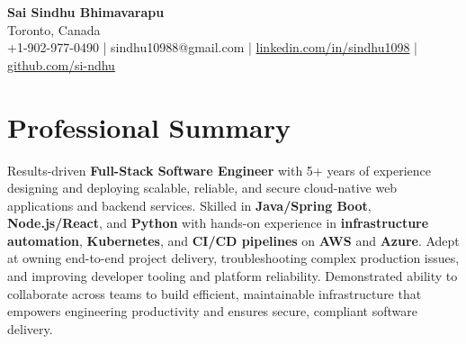 \documentclass[letterpaper,11pt]{article}
\begin{document}
\begin{center}
  {\Large \textbf{Sai Sindhu Bhimavarapu}} \\
  Toronto, Canada \\
  +1-902-977-0490 \enspace | \enspace sindhu10988@gmail.com \enspace | \enspace \href{https://www.linkedin.com/in/sindhu1098/}{linkedin.com/in/sindhu1098} \enspace | \enspace \href{https://github.com/si-ndhu}{github.com/si-ndhu}
\end{center}

\section{Professional Summary}
  \begin{itemize}[leftmargin=0.15in, label={}]
    \small{\item{
     Results-driven \textbf{Full-Stack Software Engineer} with 5+ years of experience designing and deploying scalable, reliable, and secure cloud-native web applications and backend services. Skilled in \textbf{Java/Spring Boot}, \textbf{Node.js/React}, and \textbf{Python} with hands-on experience in \textbf{infrastructure automation}, \textbf{Kubernetes}, and \textbf{CI/CD pipelines} on \textbf{AWS} and \textbf{Azure}. Adept at owning end-to-end project delivery, troubleshooting complex production issues, and improving developer tooling and platform reliability. Demonstrated ability to collaborate across teams to build efficient, maintainable infrastructure that empowers engineering productivity and ensures secure, compliant software delivery.
    }}
  \end{itemize}
\vspace{-16pt}

\end{document}

